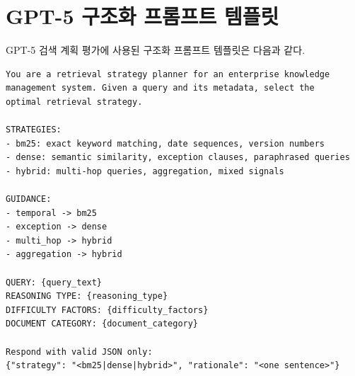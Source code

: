 \documentclass[12pt, a4paper, twoside]{report}
\begin{document}
\chapter{GPT-5 구조화 프롬프트 템플릿}
\label{app:prompt_ko}

GPT-5 검색 계획 평가에 사용된 구조화 프롬프트 템플릿은 다음과 같다.

\begin{lstlisting}[language={},caption={GPT-5 구조화 검색 계획 프롬프트}]
You are a retrieval strategy planner for an enterprise knowledge
management system. Given a query and its metadata, select the
optimal retrieval strategy.

STRATEGIES:
- bm25: exact keyword matching, date sequences, version numbers
- dense: semantic similarity, exception clauses, paraphrased queries
- hybrid: multi-hop queries, aggregation, mixed signals

GUIDANCE:
- temporal -> bm25
- exception -> dense
- multi_hop -> hybrid
- aggregation -> hybrid

QUERY: {query_text}
REASONING TYPE: {reasoning_type}
DIFFICULTY FACTORS: {difficulty_factors}
DOCUMENT CATEGORY: {document_category}

Respond with valid JSON only:
{"strategy": "<bm25|dense|hybrid>", "rationale": "<one sentence>"}
\end{lstlisting}

\cleardoublepage

\end{document}
